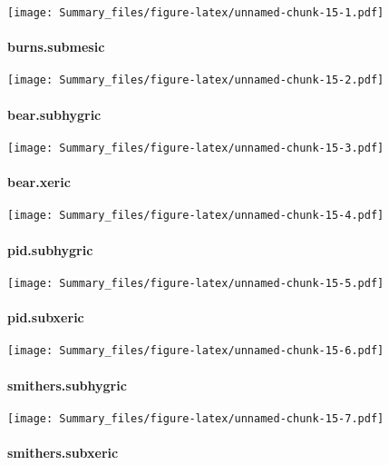 \documentclass[
]{article}
\begin{document}
\texttt{[image: Summary\_files/figure-latex/unnamed-chunk-15-1.pdf]}

\hypertarget{burns.submesic}{%
\paragraph{burns.submesic}\label{burns.submesic}}

\texttt{[image: Summary\_files/figure-latex/unnamed-chunk-15-2.pdf]}

\hypertarget{bear.subhygric}{%
\paragraph{bear.subhygric}\label{bear.subhygric}}

\texttt{[image: Summary\_files/figure-latex/unnamed-chunk-15-3.pdf]}

\hypertarget{bear.xeric}{%
\paragraph{bear.xeric}\label{bear.xeric}}

\texttt{[image: Summary\_files/figure-latex/unnamed-chunk-15-4.pdf]}

\hypertarget{pid.subhygric}{%
\paragraph{pid.subhygric}\label{pid.subhygric}}

\texttt{[image: Summary\_files/figure-latex/unnamed-chunk-15-5.pdf]}

\hypertarget{pid.subxeric}{%
\paragraph{pid.subxeric}\label{pid.subxeric}}

\texttt{[image: Summary\_files/figure-latex/unnamed-chunk-15-6.pdf]}

\hypertarget{smithers.subhygric}{%
\paragraph{smithers.subhygric}\label{smithers.subhygric}}

\texttt{[image: Summary\_files/figure-latex/unnamed-chunk-15-7.pdf]}

\hypertarget{smithers.subxeric}{%
\paragraph{smithers.subxeric}\label{smithers.subxeric}}
\end{document}
